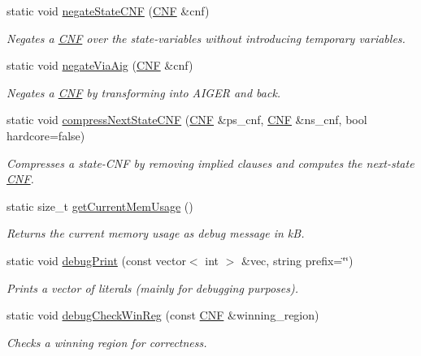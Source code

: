 \begin{DoxyCompactItemize}
static void \hyperlink{classUtils_ad6bc8cf6342b8f182597aa53cf72d9d3}{negate\-State\-C\-N\-F} (\hyperlink{classCNF}{C\-N\-F} \&cnf)
\begin{DoxyCompactList}\small\item\em Negates a \hyperlink{classCNF}{C\-N\-F} over the state-\/variables without introducing temporary variables. \end{DoxyCompactList}\item 
static void \hyperlink{classUtils_acd64e5ea20bd4579427734a9ede171d8}{negate\-Via\-Aig} (\hyperlink{classCNF}{C\-N\-F} \&cnf)
\begin{DoxyCompactList}\small\item\em Negates a \hyperlink{classCNF}{C\-N\-F} by transforming into A\-I\-G\-E\-R and back. \end{DoxyCompactList}\item 
static void \hyperlink{classUtils_a5ddf6a703833a37aae073e12d114a6c8}{compress\-Next\-State\-C\-N\-F} (\hyperlink{classCNF}{C\-N\-F} \&ps\-\_\-cnf, \hyperlink{classCNF}{C\-N\-F} \&ns\-\_\-cnf, bool hardcore=false)
\begin{DoxyCompactList}\small\item\em Compresses a state-\/\-C\-N\-F by removing implied clauses and computes the next-\/state \hyperlink{classCNF}{C\-N\-F}. \end{DoxyCompactList}\item 
static size\-\_\-t \hyperlink{classUtils_ae48658c2b3c7f71261146210c7861b60}{get\-Current\-Mem\-Usage} ()
\begin{DoxyCompactList}\small\item\em Returns the current memory usage as debug message in k\-B. \end{DoxyCompactList}\item 
static void \hyperlink{classUtils_adeaccd2a53073b17e3409eab8e98db0c}{debug\-Print} (const vector$<$ int $>$ \&vec, string prefix=\char`\"{}\char`\"{})
\begin{DoxyCompactList}\small\item\em Prints a vector of literals (mainly for debugging purposes). \end{DoxyCompactList}\item 
static void \hyperlink{classUtils_acc29602987b73022546a6d752a7e093f}{debug\-Check\-Win\-Reg} (const \hyperlink{classCNF}{C\-N\-F} \&winning\-\_\-region)
\begin{DoxyCompactList}\small\item\em Checks a winning region for correctness. \end{DoxyCompactList}\item 

\end{DoxyCompactItemize}
